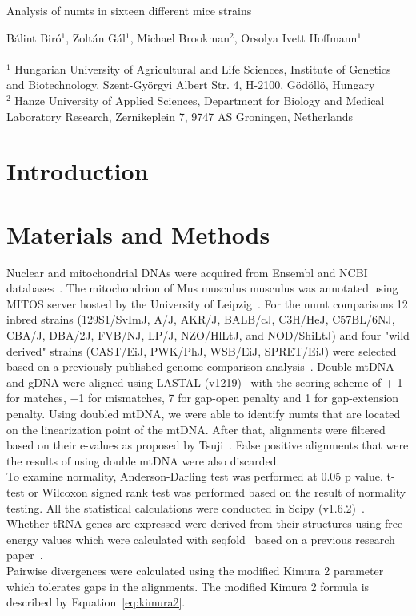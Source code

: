\documentclass[a4paper,12pt]{article}
\numberwithin{equation}{section} %
\begin{document}
\begin{center}
	\Large{Analysis of numts in sixteen different mice strains}
\end{center}
\small{Bálint Biró$^1$, Zoltán Gál$^1$, Michael Brookman$^2$, Orsolya Ivett Hoffmann$^1$}\\ \\
\scriptsize{$^1$ Hungarian University of Agricultural and Life Sciences, Institute of Genetics and Biotechnology, Szent-Györgyi Albert Str. 4, H-2100, Gödöllö, Hungary\\
$^2$ Hanze University of Applied Sciences, Department for Biology and Medical Laboratory Research, Zernikeplein 7, 9747 AS Groningen, Netherlands}

\section{Introduction}

\section{Materials and Methods}
\normalsize
\indent Nuclear and mitochondrial DNAs were acquired from Ensembl and NCBI databases~. The mitochondrion of Mus musculus musculus was annotated using MITOS server hosted by the University of Leipzig~. For the numt comparisons 12 inbred strains (129S1/SvImJ, A/J, AKR/J, BALB/cJ, C3H/HeJ, C57BL/6NJ, CBA/J, DBA/2J, FVB/NJ, LP/J, NZO/HlLtJ, and NOD/ShiLtJ) and four "wild derived" strains (CAST/EiJ, PWK/PhJ, WSB/EiJ, SPRET/EiJ) were selected based on a previously published genome comparison analysis~. Double mtDNA and gDNA were aligned using LASTAL (v1219)~ with the scoring scheme of + 1 for matches, −1 for mismatches, 7 for gap-open penalty and 1 for gap-extension penalty. Using doubled mtDNA, we were able to identify numts that are located on the linearization point of the mtDNA. After that, alignments were filtered based on their e-values as proposed by Tsuji~.  False positive alignments that were the results of using double mtDNA were also discarded.\\ \indent To examine normality, Anderson-Darling test was performed at 0.05 p value. t-test or Wilcoxon signed rank test was performed based on the result of normality testing. All the statistical calculations were conducted in Scipy (v1.6.2)~. Whether tRNA genes are expressed were derived from their structures using free energy values which were calculated with seqfold~ based on a previous research paper~. \\ Pairwise divergences were calculated using the modified Kimura 2 parameter~ which tolerates gaps in the alignments. The modified Kimura 2 formula is described by Equation~\ref{eq:kimura2}.
\end{document}
